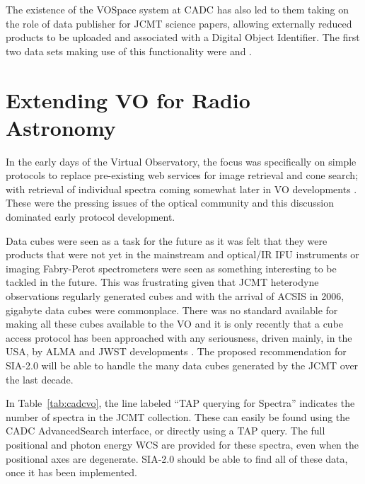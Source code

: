 \documentclass[final,authoryear,5p,times,twocolumn]{elsarticle}
\begin{document}
The existence of the VOSpace system at CADC has also led to them
taking on the role of data publisher for JCMT science papers, allowing
externally reduced products to be uploaded and associated with a
Digital Object Identifier. The first two data sets making use of this
functionality were \citet{2012MNRAS.424.3050W} and
\citet{2013ApJS..209....8D}.

\section{Extending VO for Radio Astronomy}

In the early days of the Virtual Observatory, the focus was
specifically on simple protocols \citep{siap,cone} to replace pre-existing
web services for image retrieval and cone search; with retrieval of
individual spectra coming somewhat later in VO developments
\citep{ssap,splatvo}. These were the pressing issues of the optical
community and this discussion dominated early protocol development.

Data cubes were seen as a task for the future as it was
felt that they were products that were not yet in the mainstream and
optical/IR IFU instruments \citep[such as
UIST;][]{2004SPIE.5492.1160R} or imaging Fabry-Perot spectrometers
\citep[e.g., TAURUS;][]{1982MNRAS.201..661A}
were seen as something interesting to be tackled in
the future. This was frustrating given that JCMT heterodyne
observations regularly generated cubes and with the arrival of ACSIS
in 2006, gigabyte data cubes were commonplace. There was no standard
available for making all these cubes available to the VO and it is
only recently \citep[e.g.,][]{2014AAS...22325505T} that a cube access
protocol has been approached with any seriousness, driven mainly, in
the USA, by ALMA and JWST developments \citep[e.g.,
MIRI;][]{2010SPIE.7731E..10W}. The proposed
recommendation for SIA-2.0 \citep{siav2}
will be able to handle the many data cubes generated by the JCMT
over the last decade.

In Table~\ref{tab:cadcvo}, the line labeled ``TAP querying for Spectra''
indicates the number of spectra in the JCMT collection.  These can
easily be found using the CADC AdvancedSearch interface, or directly using
a TAP query.  The full positional and photon energy WCS are provided
for these spectra, even when the positional axes are degenerate.   SIA-2.0
should be able to find all of these data, once it has been implemented.
\end{document}

